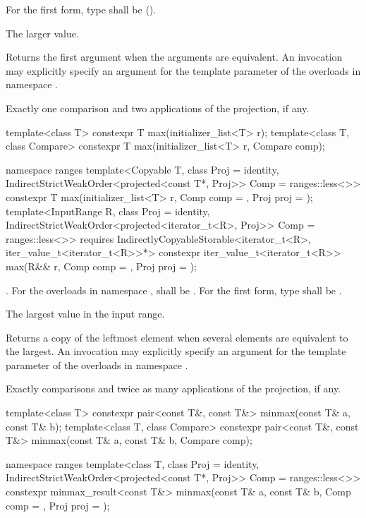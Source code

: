 \begin{itemdescr}
\pnum
\requires
For the first form, type  shall be
 ().

\pnum
\returns
The larger value.

\pnum
\remarks
Returns the first argument when the arguments are equivalent.
An invocation may explicitly specify an argument
for the template parameter 
of the overloads in namespace .

\pnum
\complexity
Exactly one comparison and two applications of the projection, if any.
\end{itemdescr}

%
\begin{itemdecl}
template<class T>
  constexpr T max(initializer_list<T> r);
template<class T, class Compare>
  constexpr T max(initializer_list<T> r, Compare comp);

namespace ranges {
  template<Copyable T, class Proj = identity,
      IndirectStrictWeakOrder<projected<const T*, Proj>> Comp = ranges::less<>>
    constexpr T max(initializer_list<T> r, Comp comp = {}, Proj proj = {});
  template<InputRange R, class Proj = identity,
      IndirectStrictWeakOrder<projected<iterator_t<R>, Proj>> Comp = ranges::less<>>
    requires IndirectlyCopyableStorable<iterator_t<R>, iter_value_t<iterator_t<R>>*>
    constexpr iter_value_t<iterator_t<R>>
      max(R&& r, Comp comp = {}, Proj proj = {});
}
\end{itemdecl}

\begin{itemdescr}
\pnum
\requires
{}.
For the overloads in namespace ,
 shall be .
For the first form, type  shall be .

\pnum
\returns The largest value in the input range.

\pnum
\remarks Returns a copy of the leftmost element when several elements are equivalent to the largest.
An invocation may explicitly specify an argument
for the template parameter 
of the overloads in namespace .

\pnum
\complexity
Exactly  comparisons
and twice as many applications of the projection, if any.
\end{itemdescr}

%
\begin{itemdecl}
template<class T> constexpr pair<const T&, const T&> minmax(const T& a, const T& b);
template<class T, class Compare>
  constexpr pair<const T&, const T&> minmax(const T& a, const T& b, Compare comp);

namespace ranges {
  template<class T, class Proj = identity,
      IndirectStrictWeakOrder<projected<const T*, Proj>> Comp = ranges::less<>>
    constexpr minmax_result<const T&>
      minmax(const T& a, const T& b, Comp comp = {}, Proj proj = {});
}
\end{itemdecl}


